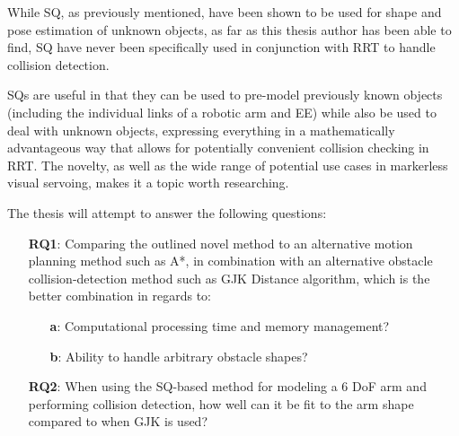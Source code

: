 While \gls{SQ}, as previously mentioned, have been shown to be used for shape and pose estimation of unknown objects, as far as this thesis author has been able to find, \gls{SQ} have never been specifically used in conjunction with \gls{RRT} to handle collision detection. 

\gls{SQ}s are useful in that they can be used to pre-model previously known objects (including the individual links of a robotic arm and \gls{EE}) while also be used to deal with unknown objects, expressing everything in a mathematically advantageous way that allows for potentially convenient collision checking in \gls{RRT}. The novelty, as well as the wide range of potential use cases in markerless visual servoing, makes it a topic worth researching.

The thesis will attempt to answer the following questions:

\begin{enumerate}
	 \item[\textbf{RQ1}:] Comparing the outlined novel method to an alternative motion planning method such as A*, in combination with an alternative obstacle collision-detection method such as \gls{GJK} Distance algorithm, which is the better combination in regards to: 
	 \begin{itemize} 
	 	\item[\textbf{a}:] Computational processing time and memory management? 
		\item[\textbf{b}:] Ability to handle arbitrary obstacle shapes? 
	 \end{itemize}
	 \item[\textbf{RQ2}:] When using the \gls{SQ}-based method for modeling a 6 DoF arm and performing collision detection, how well can it be fit to the arm shape compared to when \gls{GJK} is used?
	 
\end{enumerate}


%	


